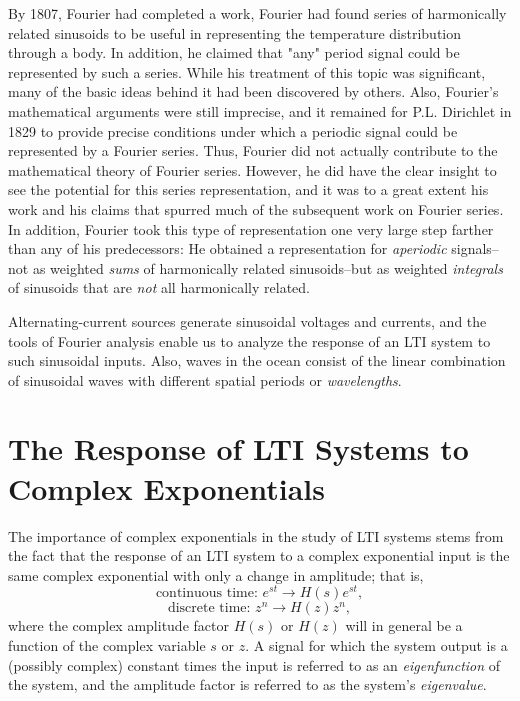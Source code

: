 \documentclass[a4paper,10pt,twoside]{book}
\begin{document}
By 1807, Fourier had completed a work, Fourier had found series of harmonically related sinusoids to be useful in representing the temperature distribution through a body. In addition, he claimed that "any" period signal could be represented by such a series. While his treatment of this topic was significant, many of the basic ideas behind it had been discovered by others. Also, Fourier's mathematical arguments were still imprecise, and it remained for P.L. Dirichlet in 1829 to provide precise conditions under which a periodic signal could be represented by a Fourier series. Thus, Fourier did not actually contribute to the mathematical theory of Fourier series. However, he did have the clear insight to see the potential for this series representation, and it was to a great extent his work and his claims that spurred much of the subsequent work on Fourier series. In addition, Fourier took this type of representation one very large step farther than any of his predecessors: He obtained a representation for \textit{aperiodic} signals--not as weighted \textit{sums} of harmonically related sinusoids--but as weighted \textit{integrals} of sinusoids that are \textit{not} all harmonically related.

Alternating-current sources generate sinusoidal voltages and currents, and the tools of Fourier analysis enable us to analyze the response of an LTI system to such sinusoidal inputs. Also, waves in the ocean consist of the linear combination of sinusoidal waves with different spatial periods or \textit{wavelengths}.

\section{The Response of LTI Systems to Complex Exponentials}
\label{section:3.2}

The importance of complex exponentials in the study of LTI systems stems from the fact that the response of an LTI system to a complex exponential input is the same complex exponential with only a change in amplitude; that is,
\begin{equation}
    \text{continuous time: }e^{st}\longrightarrow H(s)e^{st},
    \label{3.1}
\end{equation}
\begin{equation}
    \text{discrete time: }z^n\longrightarrow H(z)z^n,
    \label{3.2}
\end{equation}
where the complex amplitude factor $H(s)$ or $H(z)$ will in general be a function of the complex variable $s$ or $z$. A signal for which the system output is a (possibly complex) constant times the input is referred to as an \textit{eigenfunction} of the system, and the amplitude factor is referred to as the system's \textit{eigenvalue}.
\end{document}
